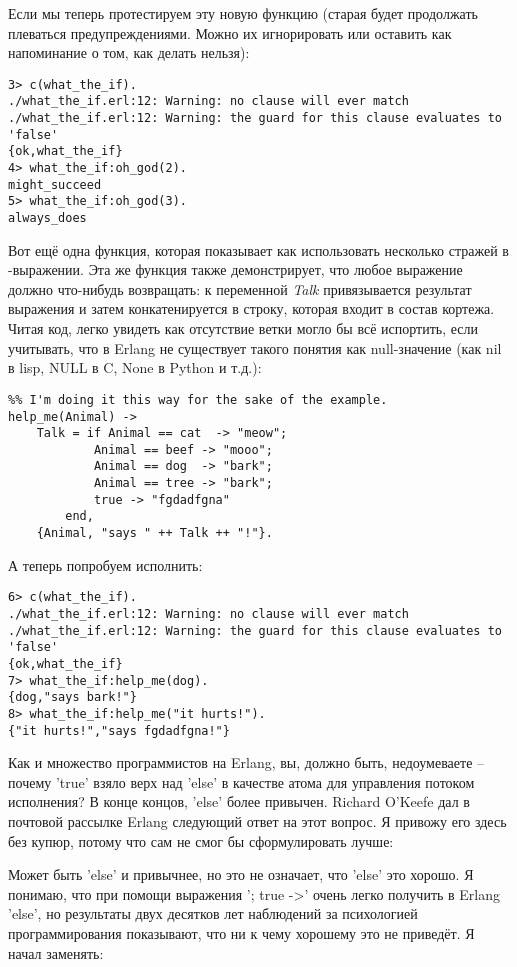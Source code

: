 Если мы теперь протестируем эту новую функцию (старая будет продолжать плеваться предупреждениями. Можно их игнорировать или оставить как напоминание о том, как делать нельзя):
\begin{lstlisting}[style=erlang]
3> c(what_the_if).
./what_the_if.erl:12: Warning: no clause will ever match
./what_the_if.erl:12: Warning: the guard for this clause evaluates to 'false'
{ok,what_the_if}
4> what_the_if:oh_god(2).
might_succeed
5> what_the_if:oh_god(3).
always_does
\end{lstlisting}

Вот ещё одна функция, которая показывает как использовать несколько стражей в \--выражении. Эта же функция также демонстрирует, что любое выражение должно что\--нибудь возвращать: к переменной \emph{Talk} привязывается результат выражения  и затем конкатенируется в строку, которая входит в состав кортежа. Читая код, легко увидеть как отсутствие ветки  могло бы всё испортить, если учитывать, что в Erlang не существует такого понятия как null\--значение (как nil в lisp, NULL в C, None в Python и т.д.):
\begin{lstlisting}[style=erlang]
%% note, this one would be better as a pattern match in function heads!
%% I'm doing it this way for the sake of the example.
help_me(Animal) ->
    Talk = if Animal == cat  -> "meow";
            Animal == beef -> "mooo";
            Animal == dog  -> "bark";
            Animal == tree -> "bark";
            true -> "fgdadfgna"
        end,
    {Animal, "says " ++ Talk ++ "!"}.
\end{lstlisting}
А теперь попробуем исполнить:
\begin{lstlisting}[style=erlang]
6> c(what_the_if).
./what_the_if.erl:12: Warning: no clause will ever match
./what_the_if.erl:12: Warning: the guard for this clause evaluates to 'false'
{ok,what_the_if}
7> what_the_if:help_me(dog).
{dog,"says bark!"}
8> what_the_if:help_me("it hurts!").
{"it hurts!","says fgdadfgna!"}
\end{lstlisting}
Как и множество программистов на Erlang, вы, должно быть, недоумеваете \--- почему 'true' взяло верх над 'else' в качестве атома для управления потоком исполнения? В конце концов, 'else' более привычен. Richard O'Keefe дал в почтовой рассылке Erlang следующий ответ на этот вопрос. Я привожу его здесь без купюр, потому что сам не смог бы сформулировать лучше:\\
\colorbox{lgray}
{
    \begin{minipage}{\linewidth}
    Может быть 'else' и привычнее, но это не означает, что 'else' это хорошо. Я понимаю, что при помощи выражения '; true ->' очень легко получить в Erlang 'else', но результаты двух десятков лет наблюдений за психологией программирования показывают, что ни к чему хорошему это не приведёт. Я начал заменять:
\end{minipage}
}
